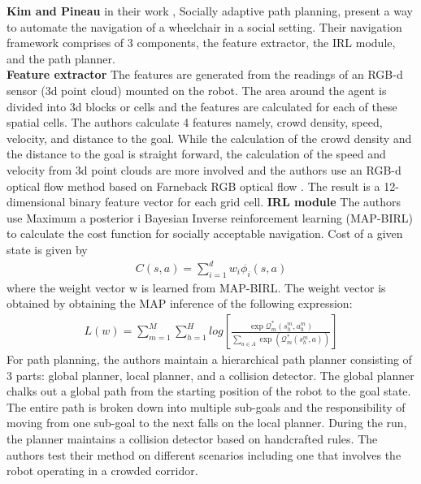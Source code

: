 \textbf{Kim and Pineau} in their work \cite{kim_socially_2016}, Socially adaptive path planning, present a way to automate the navigation of a wheelchair in a social setting. Their navigation framework comprises of 3 components, the feature extractor, the IRL module, and the path planner.\\
\textbf{Feature extractor}
The features are generated from the readings of an RGB-d sensor (3d point cloud) mounted on the robot. The area around the agent is divided into 3d blocks or cells and the features are calculated for each of these spatial cells. 
The authors calculate 4 features namely,
crowd density, speed, velocity, and distance to the goal.
While the calculation of the crowd density and the distance to the goal is straight forward, the calculation of the speed and velocity from 3d point clouds are more involved and the authors use an RGB-d optical flow method based on Farneback RGB optical flow \cite{farneback_optical_flow}. 
The result is a 12-dimensional binary feature vector for each grid cell.
\textbf{IRL module}
The authors use Maximum a posterior i Bayesian Inverse reinforcement learning (MAP-BIRL) \cite{choi_MAP-BIRL_2011} to calculate the cost function for socially acceptable navigation. Cost of a given state is given by
\begin{align}
C(s,a) = \sum^{d}_{i=1} w_i \phi_i(s,a)
\end{align}
where the weight vector w is learned from MAP-BIRL. 
The weight vector is obtained by obtaining the MAP inference of the following expression:
\begin{align}
L(w) = \sum^M_{m=1} \sum^{H}_{h=1}log[\frac{\exp \mathcal{Q}^{*}_m(s^m_h, a^m_h)}{\sum_{a\in A} \exp(\mathcal{Q}_m^*(s_h^m,a))}]
\end{align}
For path planning, the authors maintain a hierarchical path planner consisting of 3 parts: global planner, local planner, and a collision detector.
The global planner chalks out a global path from the starting position of the robot to the goal state. The entire path is broken down into multiple sub-goals and the responsibility of moving from one sub-goal to the next falls on the local planner. During the run, the planner maintains a collision detector based on handcrafted rules.
The authors test their method on different scenarios including one that involves the robot operating in a crowded corridor.\\

